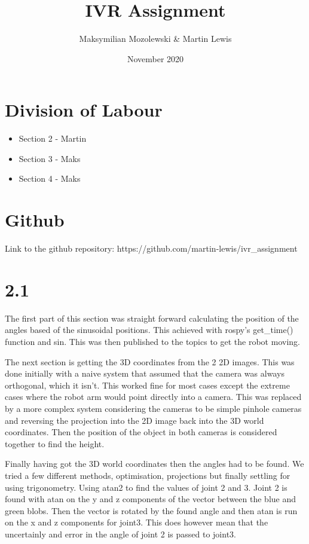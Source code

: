 \documentclass{report}
\title{IVR Assignment}
\author{Maksymilian Mozolewski \& Martin Lewis}
\date{November 2020}
\begin{document}
\maketitle

\section*{Division of Labour}

\begin{itemize}
    \item Section 2 - Martin
    \item Section 3 - Maks
    \item Section 4 - Maks
\end{itemize}

\section*{Github}

Link to the github repository: https://github.com/martin-lewis/ivr\_assignment

\section*{2.1}

The first part of this section was straight forward calculating the position of the angles based of the sinusoidal positions. This achieved with rospy's get\_time() function and sin.
This was then published to the topics to get the robot moving.

The next section is getting the 3D coordinates from the 2 2D images. This was done initially with a naive system that assumed that the camera was always orthogonal,
which it isn't. This worked fine for most cases except the extreme cases where the robot arm would point directly into a camera. This was replaced by a more complex
system considering the cameras to be simple pinhole cameras and reversing the projection into the 2D image back into the 3D world coordinates. Then the position
of the object in both cameras is considered together to find the height.

Finally having got the 3D world coordinates then the angles had to be found. We tried a few different methods, optimisation, projections but finally settling for using trigonometry. Using atan2 to find the values of
joint 2 and 3. Joint 2 is found with atan on the y and z components of the vector between the blue and green blobs. Then the vector is rotated by the found angle
and then atan is run on the x and z components for joint3. This does however mean that the uncertainly and error in the angle of joint 2 is passed to joint3.
\end{document}
